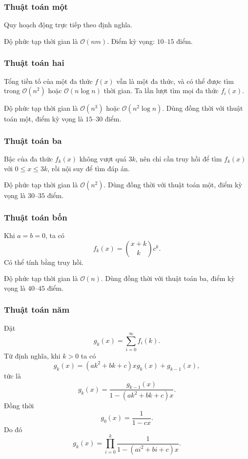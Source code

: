 \documentclass[11pt]{article}
\newcommand{\Oh}{\mathcal{O}}
\begin{document}
\subsubsection{Thuật toán một}

Quy hoạch động trực tiếp theo định nghĩa.

Độ phức tạp thời gian là \(\Oh(nm)\). Điểm kỳ vọng: \(10\)--\(15\) điểm.

\subsubsection{Thuật toán hai}

Tổng tiền tố của một đa thức \(f(x)\) vẫn là một đa thức, và có thể được tìm
trong \(\Oh(n^2)\) hoặc \(\Oh(n\log n)\) thời gian. Ta lần lượt tìm mọi đa
thức \(f_i(x)\).

Độ phức tạp thời gian là \(\Oh(n^3)\) hoặc \(\Oh(n^2\log n)\). Dùng đồng thời
với thuật toán một, điểm kỳ vọng là \(15\)--\(30\) điểm.

\subsubsection{Thuật toán ba}

Bậc của đa thức \(f_k(x)\) không vượt quá \(3k\), nên chỉ cần truy hồi để tìm
\(f_k(x)\) với \(0\le x\le 3k\), rồi nội suy để tìm đáp án.

Độ phức tạp thời gian là \(\Oh(n^2)\). Dùng đồng thời với thuật toán một,
điểm kỳ vọng là \(30\)--\(35\) điểm.

\subsubsection{Thuật toán bốn}

Khi \(a=b=0\), ta có
\[
  f_k(x)=\binom{x+k}{k}c^k.
\]
Có thể tính bằng truy hồi.

Độ phức tạp thời gian là \(\Oh(n)\). Dùng đồng thời với thuật toán ba, điểm
kỳ vọng là \(40\)--\(45\) điểm.

\subsubsection{Thuật toán năm}

Đặt
\[
  g_k(x)=\sum_{i=0}^{\infty} f_i(k).
\]
Từ định nghĩa, khi \(k>0\) ta có
\[
  g_k(x)=(ak^2+bk+c)xg_k(x)+g_{k-1}(x),
\]
tức là
\[
  g_k(x)=\frac{g_{k-1}(x)}{1-(ak^2+bk+c)x}.
\]
Đồng thời
\[
  g_0(x)=\frac{1}{1-cx}.
\]
Do đó
\[
  g_k(x)=\prod_{i=0}^{k}\frac{1}{1-(ai^2+bi+c)x}.
\]
\end{document}
